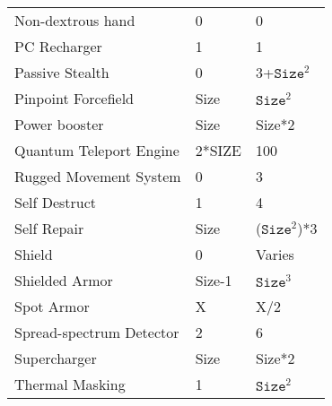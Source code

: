 \documentclass[twoside]{book}
\begin{document}
\begin{longtable}{p{1.25in}ll}
  \raggedright
           Non-dextrous hand 
  &
   0 
  &
   0 
  \tabularnewline
      
  \raggedright
           PC Recharger 
  &
   1 
  &
   1 
  \tabularnewline
      
  \raggedright
           Passive Stealth 
  &
   0 
  &
   3+\begin{math}{\texttt{Size}}^{2}\end{math} 
  \tabularnewline
      
  \raggedright
           Pinpoint Forcefield 
  &
   Size 
  &
   \begin{math}{\texttt{Size}}^{2}\end{math} 
  \tabularnewline
      
  \raggedright
           Power booster 
  &
   Size 
  &
   Size*2 
  \tabularnewline
      
  \raggedright
           Quantum Teleport Engine
           
  &
   2*SIZE 
  &
   100 
  \tabularnewline
      
  \raggedright
           Rugged Movement System 
  &
   0 
  &
   3 
  \tabularnewline
      
  \raggedright
           Self Destruct 
  &
   1 
  &
   4 
  \tabularnewline
      
  \raggedright
           Self Repair 
  &
   Size 
  &
   (\begin{math}{\texttt{Size}}^{2}\end{math})*3 
  \tabularnewline
      
  \raggedright
           Shield 
  &
   0 
  &
   Varies 
  \tabularnewline
      
  \raggedright
           Shielded Armor 
  &
   Size-1 
  &
   \begin{math}{\texttt{Size}}^{3}\end{math} 
  \tabularnewline
      
  \raggedright
           Spot Armor 
  &
   X 
  &
   X/2 
  \tabularnewline
      
  \raggedright
           Spread-spectrum Detector
           
  &
   2 
  &
   6 
  \tabularnewline
      
  \raggedright
           Supercharger 
  &
   Size 
  &
   Size*2 
  \tabularnewline
      
  \raggedright
           Thermal Masking 
  &
   1 
  &
   \begin{math}{\texttt{Size}}^{2}\end{math} 
  \tabularnewline
      

\end{longtable}
\end{document}
